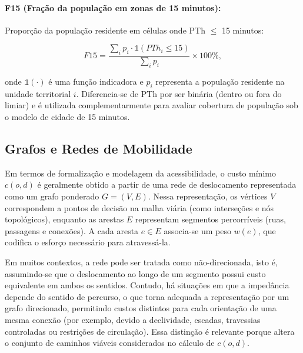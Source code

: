 \paragraph{F15 (Fração da população em zonas de 15 minutos):} Proporção da população
residente em células onde PTh $\leq$ 15 minutos:

\begin{equation}
    F15 = \frac{\sum_i p_i \cdot \mathbb{1}(PTh_i \leq 15)}{\sum_i p_i} \times 100\%,
\end{equation}

\noindent onde $\mathbb{1}(\cdot)$ é uma função indicadora e $p_i$ representa a população residente na unidade territorial $i$. Diferencia-se de PTh por 
ser binária (dentro ou fora do limiar) e é utilizada complementarmente para avaliar 
cobertura de população sob o modelo de cidade de 15 minutos.

\subsection{Grafos e Redes de Mobilidade}

Em termos de formalização e modelagem da acessibilidade, o custo mínimo $c(o,d)$ é geralmente obtido a partir de uma rede de deslocamento representada como um grafo ponderado $G=(V,E)$. Nessa representação, os vértices $V$ correspondem a pontos de decisão na malha viária (como interseções e nós topológicos), enquanto as arestas $E$ representam segmentos percorríveis (ruas, passagens e conexões). A cada aresta $e \in E$ associa-se um peso $w(e)$, que codifica o esforço necessário para atravessá-la.

Em muitos contextos, a rede pode ser tratada como não-direcionada, isto é, assumindo-se que o deslocamento ao longo de um segmento possui custo equivalente em ambos os sentidos. Contudo, há situações em que a impedância depende do sentido de percurso, o que torna adequada a representação por um grafo direcionado, permitindo custos distintos para cada orientação de uma mesma conexão (por exemplo, devido a declividade, escadas, travessias controladas ou restrições de circulação). Essa distinção é relevante porque altera o conjunto de caminhos viáveis considerados no cálculo de $c(o,d)$.

